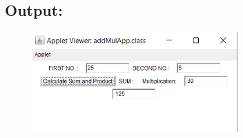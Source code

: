 \documentclass[12pt, a4paper]{article}
\begin{document}
\subsection*{Output:}
\begin{figure}[h]
  \centering
  \includegraphics[width=0.7\textwidth]{addmul}
\end{figure}
\newpage
\end{document}
